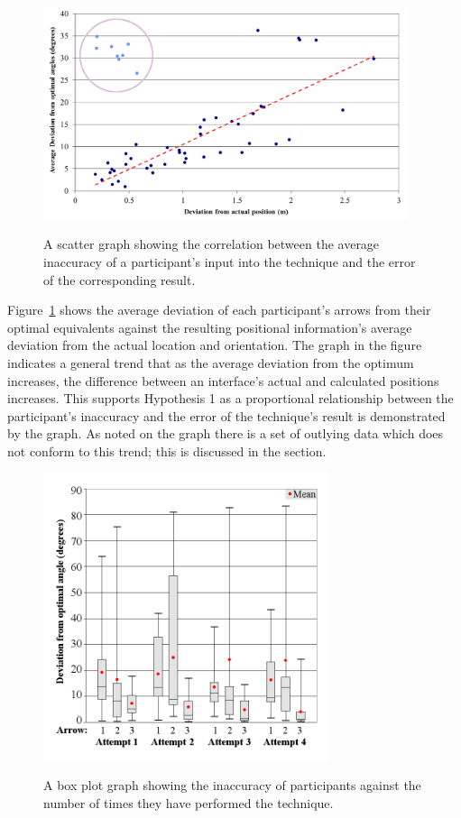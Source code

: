 \documentclass{bmcart}
\begin{document}
\begin{figure}[h]
   \centering
   \caption{A scatter graph showing the correlation between the average inaccuracy of a participant's input into the technique and the error of the corresponding result.}
   \includegraphics[width=0.95\textwidth]{figures/angle_deviation_scatter.png}
   \label{fig:scatterAverage}
\end{figure}

Figure~\ref{fig:scatterAverage} shows the average deviation of each participant's arrows from their optimal equivalents against the resulting positional information's average deviation from the actual location and orientation.
The graph in the figure indicates a general trend that as the average deviation from the optimum increases, the difference between an interface's actual and calculated positions increases.
This supports Hypothesis 1 as a proportional relationship between the participant's inaccuracy and the error of the technique's result is demonstrated by the graph.
As noted on the graph there is a set of outlying data which does not conform to this trend; this is discussed in the  section.

\begin{figure}[h]
   \centering
   \caption{A box plot graph showing the inaccuracy of participants against the number of times they have performed the technique.}
   \includegraphics[width=0.75\textwidth]{figures/angle_deviation_boxplots.png}
   \label{fig:boxPlot}
\end{figure}
\end{document}
